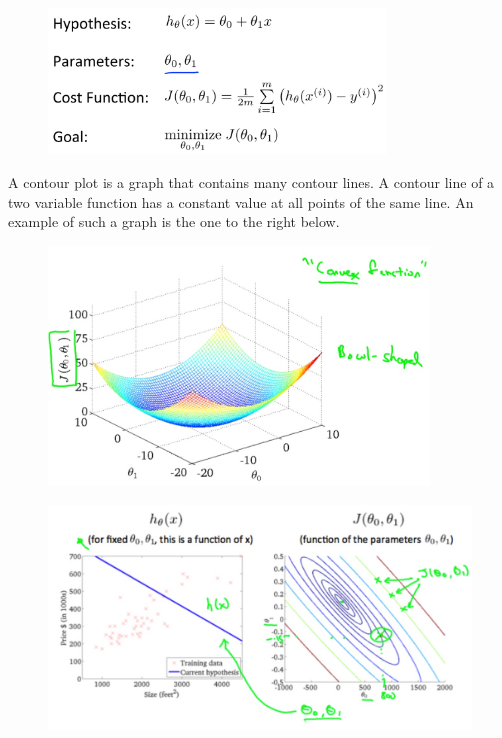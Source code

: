 \documentclass[12pt, A4,onecolumn]{article} %
\begin{document}
\begin{figure}[H]
	\centering
	\includegraphics[width=0.8\textwidth]{./Imagenes/intuitionII}
\end{figure}	

A contour plot is a graph that contains many contour lines. A contour line of a two variable function has a constant value at all points of the same line. An example of such a graph is the one to the right below.
\begin{figure}[H]
	\centering
	\includegraphics[width=0.9\textwidth]{./Imagenes/convexFunc}
\end{figure}	

\begin{figure}[H]
	\centering
	\includegraphics[width=1\textwidth]{./Imagenes/costFunc9}
\end{figure}	
\end{document}
